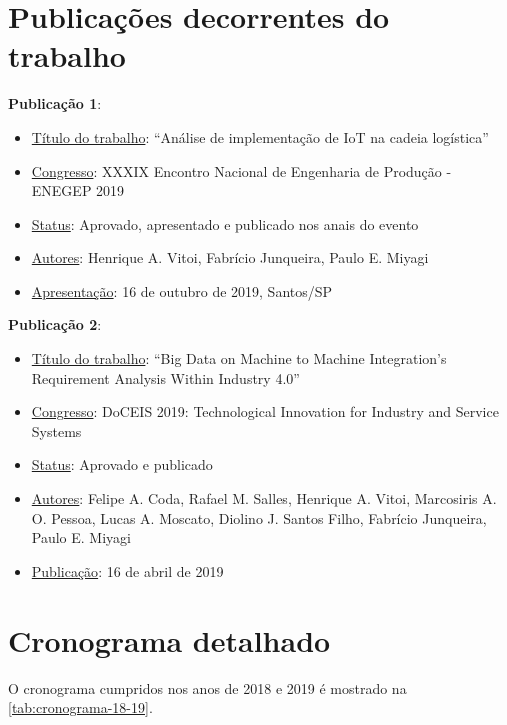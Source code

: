\chapter{Publicações decorrentes do trabalho}


	\textbf{Publicação 1}:
	\begin{itemize}
		\item \underline{Título do trabalho}: “Análise de implementação de IoT na cadeia logística”
		\item \underline{Congresso}: XXXIX Encontro Nacional de Engenharia de Produção - ENEGEP 2019
		\item \underline{Status}: Aprovado, apresentado e publicado nos anais do evento
		\item \underline{Autores}:  Henrique A. Vitoi, Fabrício Junqueira, Paulo E. Miyagi
		\item \underline{Apresentação}: 16 de outubro de 2019, Santos/SP
	\end{itemize}
	
	\bigskip

	\textbf{Publicação 2}:
	\begin{itemize}
		\item \underline{Título do trabalho}: “Big Data on Machine to Machine Integration's Requirement Analysis Within Industry 4.0”
		\item \underline{Congresso}: DoCEIS 2019: Technological Innovation for Industry and Service Systems
		\item \underline{Status}: Aprovado e publicado
		\item \underline{Autores}:  Felipe A. Coda, Rafael M. Salles, Henrique A. Vitoi, Marcosiris A. O. Pessoa, Lucas A. Moscato, Diolino J. Santos Filho, Fabrício Junqueira, Paulo E. Miyagi
		\item \underline{Publicação}: 16 de abril de 2019
	\end{itemize}


\chapter{Cronograma detalhado}

	O cronograma cumpridos nos anos de 2018 e 2019 é mostrado na \autoref{tab:cronograma-18-19}.
	
